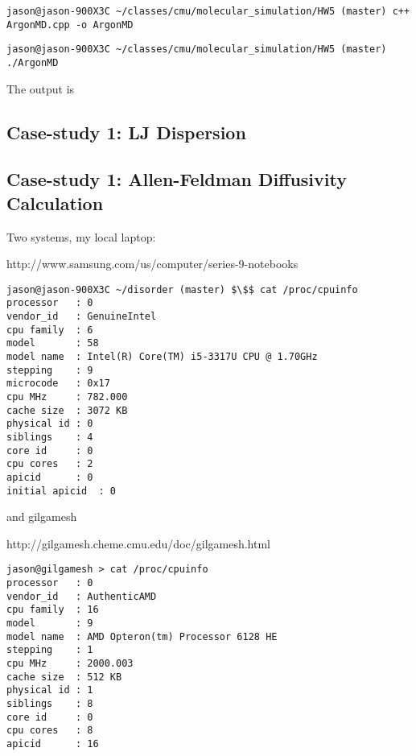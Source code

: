 \lstset{language=Shell}
\begin{lstlisting}[label=some-code,caption=Some Code]
jason@jason-900X3C ~/classes/cmu/molecular_simulation/HW5 (master) c++ ArgonMD.cpp -o ArgonMD
\end{lstlisting}

\lstset{language=Shell}
\begin{lstlisting}[label=some-code,caption=Some Code]
jason@jason-900X3C ~/classes/cmu/molecular_simulation/HW5 (master) ./ArgonMD
\end{lstlisting}

The output is

\subsection{Case-study 1: LJ Dispersion}

\subsection{Case-study 1: Allen-Feldman Diffusivity Calculation}

Two systems, my local laptop:

http://www.samsung.com/us/computer/series-9-notebooks

\lstset{language=Shell}
\begin{lstlisting}[label=some-code,caption=Some Code]
jason@jason-900X3C ~/disorder (master) $\$$ cat /proc/cpuinfo 
processor	: 0
vendor_id	: GenuineIntel
cpu family	: 6
model		: 58
model name	: Intel(R) Core(TM) i5-3317U CPU @ 1.70GHz
stepping	: 9
microcode	: 0x17
cpu MHz		: 782.000
cache size	: 3072 KB
physical id	: 0
siblings	: 4
core id		: 0
cpu cores	: 2
apicid		: 0
initial apicid	: 0
\end{lstlisting}


and gilgamesh

http://gilgamesh.cheme.cmu.edu/doc/gilgamesh.html

\lstset{language=Shell}
\begin{lstlisting}[label=some-code,caption=Some Code]
jason@gilgamesh > cat /proc/cpuinfo
processor	: 0
vendor_id	: AuthenticAMD
cpu family	: 16
model		: 9
model name	: AMD Opteron(tm) Processor 6128 HE
stepping	: 1
cpu MHz		: 2000.003
cache size	: 512 KB
physical id	: 1
siblings	: 8
core id		: 0
cpu cores	: 8
apicid		: 16
\end{lstlisting}


